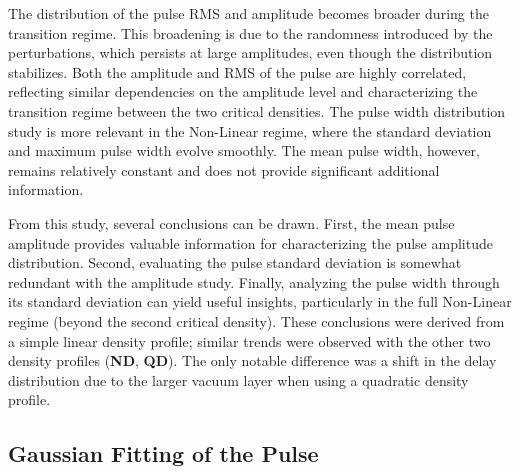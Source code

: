 \documentclass[11pt,openany]{report}
\begin{document}
\begin{multicols}{2}
\begin{figure}[H]
        \label{fig:barrier}
    \end{figure}The distribution of the pulse RMS and amplitude becomes broader during the transition regime. This broadening is due to the randomness introduced by the perturbations, which persists at large amplitudes, even though the distribution stabilizes. Both the amplitude and RMS of the pulse are highly correlated, reflecting similar dependencies on the amplitude level and characterizing the transition regime between the two critical densities. The pulse width distribution study is more relevant in the Non-Linear regime, where the standard deviation and maximum pulse width evolve smoothly. The mean pulse width, however, remains relatively constant and does not provide significant additional information.

    From this study, several conclusions can be drawn. First, the mean pulse amplitude provides valuable information for characterizing the pulse amplitude distribution. Second, evaluating the pulse standard deviation is somewhat redundant with the amplitude study. Finally, analyzing the pulse width through its standard deviation can yield useful insights, particularly in the full Non-Linear regime (beyond the second critical density). These conclusions were derived from a simple linear density profile; similar trends were observed with the other two density profiles (\textbf{ND}, \textbf{QD}). The only notable difference was a shift in the delay distribution due to the larger vacuum layer when using a quadratic density profile.

    \subsection{Gaussian Fitting of the Pulse}


\end{multicols}
\end{document}
